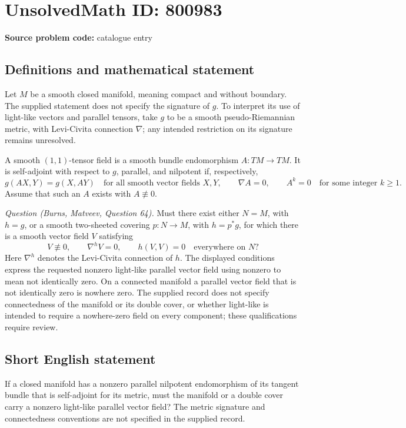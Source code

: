 \documentclass[11pt]{article}
\begin{document}
\section*{UnsolvedMath ID: 800983}
\textbf{Source problem code:} catalogue entry
\subsection{Definitions and mathematical statement}
Let \(M\) be a smooth closed manifold, meaning compact and without boundary. The supplied statement does not specify the signature of \(g\). To interpret its use of light-like vectors and parallel tensors, take \(g\) to be a smooth pseudo-Riemannian metric, with Levi-Civita connection \(\nabla\); any intended restriction on its signature remains unresolved.

A smooth \((1,1)\)-tensor field is a smooth bundle endomorphism \(A:TM\to TM\). It is self-adjoint with respect to \(g\), parallel, and nilpotent if, respectively,
\[
 g(AX,Y)=g(X,AY)\quad\text{for all smooth vector fields }X,Y,
 \qquad \nabla A=0,
 \qquad A^k=0\quad\text{for some integer }k\geq 1.
\]
Assume that such an \(A\) exists with \(A\not\equiv 0\).

\emph{Question (Burns, Matveev, Question 64).} Must there exist either \(N=M\), with \(h=g\), or a smooth two-sheeted covering \(p:N\to M\), with \(h=p^*g\), for which there is a smooth vector field \(V\) satisfying
\[
 V\not\equiv 0,\qquad \nabla^{h}V=0,\qquad h(V,V)=0\quad\text{everywhere on }N?
\]
Here \(\nabla^h\) denotes the Levi-Civita connection of \(h\). The displayed conditions express the requested nonzero light-like parallel vector field using nonzero to mean not identically zero. On a connected manifold a parallel vector field that is not identically zero is nowhere zero. The supplied record does not specify connectedness of the manifold or its double cover, or whether light-like is intended to require a nowhere-zero field on every component; these qualifications require review.
\subsection{Short English statement}
If a closed manifold has a nonzero parallel nilpotent endomorphism of its tangent bundle that is self-adjoint for its metric, must the manifold or a double cover carry a nonzero light-like parallel vector field? The metric signature and connectedness conventions are not specified in the supplied record.
\end{document}

